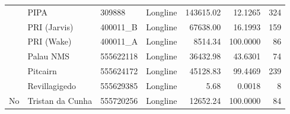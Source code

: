 \begin{table}
\begin{tabular}[t]{llllrrr}
\cmidrule{2-7}
 & PIPA & 309888 & Longline & 143615.02 & 12.1265 & 324\\
\cmidrule{2-7}
 & PRI (Jarvis) & 400011\_B & Longline & 67638.00 & 16.1993 & 159\\
\cmidrule{2-7}
 & PRI (Wake) & 400011\_A & Longline & 8514.34 & 100.0000 & 86\\
\cmidrule{2-7}
 & Palau NMS & 555622118 & Longline & 36432.98 & 43.6301 & 74\\
\cmidrule{2-7}
 & Pitcairn & 555624172 & Longline & 45128.83 & 99.4469 & 239\\
\cmidrule{2-7}
 & Revillagigedo & 555629385 & Longline & 5.68 & 0.0018 & 8\\
\cmidrule{2-7}
\multirow{-15}{*}{\raggedright\arraybackslash No} & Tristan da Cunha & 555720256 & Longline & 12652.24 & 100.0000 & 84\\
\bottomrule
\end{tabular}
\end{table}
